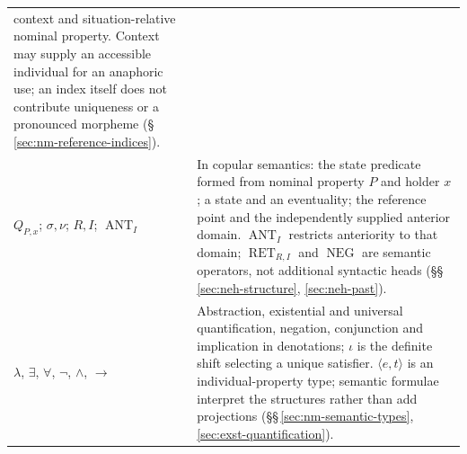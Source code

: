 \begin{longtable}{@{}p{}p{}@{}}
context and situation-relative nominal property. Context may supply an
accessible individual for an anaphoric use; an index itself does not
contribute uniqueness or a pronounced morpheme
(§\,\ref{sec:nm-reference-indices}). \\
$Q_{P,x}$; $\sigma,\nu$; $R,I$; $\operatorname{ANT}_{I}$ & In copular
semantics: the state predicate formed from nominal property $P$ and holder
$x$; a state and an eventuality; the reference point and the independently
supplied anterior domain. $\operatorname{ANT}_{I}$ restricts anteriority
to that domain; $\operatorname{RET}_{R,I}$ and $\operatorname{NEG}$ are
semantic operators, not additional syntactic heads
(§§\,\ref{sec:neh-structure}, \ref{sec:neh-past}). \\
$\lambda$, $\exists$, $\forall$, $\neg$, $\land$, $\rightarrow$ & Abstraction,
existential and universal quantification, negation, conjunction and implication
in denotations; $\iota$ is the definite shift selecting a unique satisfier. $\langle e,t\rangle$ is an individual-property type;
semantic formulae interpret the structures rather than add projections
(§§\,\ref{sec:nm-semantic-types}, \ref{sec:exst-quantification}). \\
\end{longtable}\endgroup
